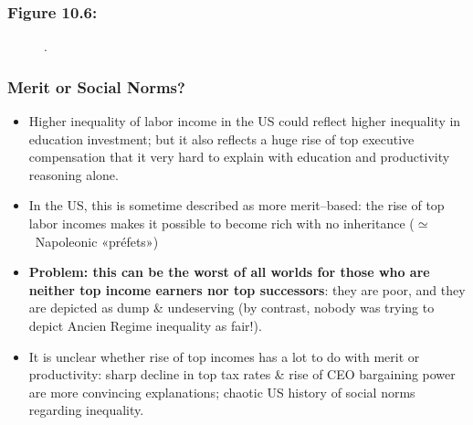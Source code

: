 \documentclass[t]{beamer}\usepackage[]{graphicx}\usepackage[]{color}
\begin{document}
\begin{frame}[label=Figure_10_6]
\frametitle{Figure 10.6: }
\begin{figure}[t]
\begin{minipage}[b]{\textwidth}
\centering

\caption{.}
\end{minipage}
\end{figure}
\end{frame}






\begin{frame}[label=MeritVNorms]
\frametitle{Merit or Social Norms?}
\begin{itemize}
\item
Higher inequality of labor income in the US could reflect higher inequality in education investment; but it also reflects a huge rise of top executive compensation that it very hard to explain with education and productivity reasoning alone.
\item 
In the US, this is sometime described as more merit--based: the rise of top labor incomes makes it possible to become rich with no inheritance ($\simeq$~Napoleonic «préfets»)
\item 
\textbf{Problem: this can be the worst of all worlds for those who are neither top income earners nor top successors}: they are poor, and they are depicted as dump \& undeserving (by contrast, nobody was trying to depict Ancien Regime inequality as fair!).
\item 
It is unclear whether rise of top incomes has a lot to do with merit or productivity: sharp decline in top tax rates \& rise of CEO bargaining power are more convincing explanations; chaotic US history of social norms regarding inequality.
\end{itemize}
\end{frame}






\end{document}
